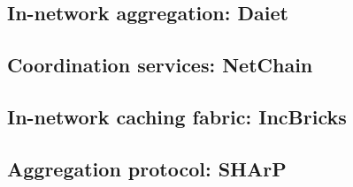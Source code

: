 

\subsection{In-network aggregation: Daiet \texorpdfstring{\cite{daiet}}{}}

\newpage

\subsection{Coordination services: NetChain \texorpdfstring{\cite{netchain}}{}}

\newpage

\subsection{In-network caching fabric: IncBricks \texorpdfstring{\cite{incbricks}}{}}

\newpage

\subsection{Aggregation protocol: SHArP \texorpdfstring{\cite{sharp}}{}}
